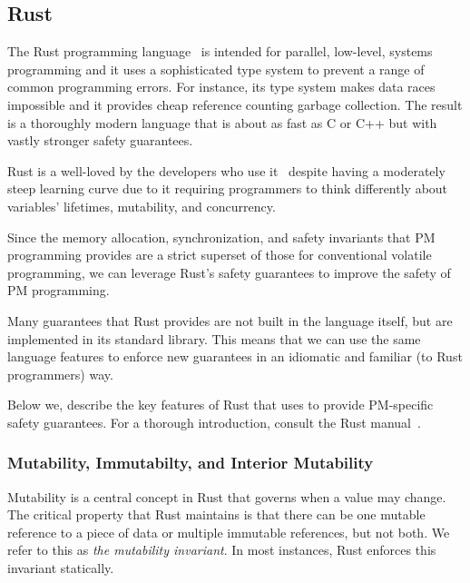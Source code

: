 \subsection{Rust}
\label{sec:rust}

The Rust programming language~\cite{rustbook} is intended for parallel,
low-level, systems programming and it uses a sophisticated type system to
prevent a range of common programming errors.  For instance, its type system 
makes data races impossible and it provides cheap reference counting garbage collection.
The result is a thoroughly modern language that is about as fast
as C or C++ but with vastly stronger safety guarantees.

Rust is a well-loved by the developers who use it~\cite{mostloved} despite having
a moderately steep learning curve due to it requiring
programmers to think differently about variables' lifetimes, mutability, and
concurrency.

Since the memory allocation, synchronization, and safety invariants that PM
programming provides are a strict superset of those for conventional volatile
programming, we can leverage Rust's safety guarantees to improve the safety of
PM programming.

Many guarantees that Rust provides are not built in the
language itself, but are implemented in its standard library.  This means that
we can use the same language features to enforce new guarantees in an idiomatic
and familiar (to Rust programmers) way.

Below we, describe the key features of Rust that \this{} uses to provide
PM-specific safety guarantees.  For a thorough introduction, consult the Rust manual~\cite{rustbook}.

\subsubsection{Mutability, Immutabilty, and Interior Mutability}

Mutability is a central concept in Rust that governs when a value may change.
The critical property that Rust maintains is that there can be one mutable
reference to a piece of data or multiple immutable references, but not both.
We refer to this as \emph{the mutability invariant}.  In most instances, Rust
enforces this invariant statically.


